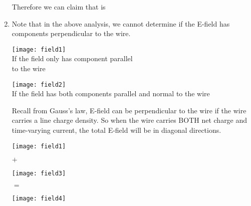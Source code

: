 \documentclass[class=article, crop=false, 12pt]{standalone}
\begin{document}
\begin{example}
\begin{enumerate}
        Therefore we can claim that  is

        \newpage
        \item Note that in the above analysis,
        we cannot determine if the E-field has components perpendicular to the wire.

        \begin{center}
            \begin{minipage}{0.3\linewidth}
                \centering
                \texttt{[image: field1]}\\
                If the field only has component parallel\\ to the wire
            \end{minipage}
            \hspace{0.05\textwidth}
            \begin{minipage}{0.3\linewidth}
                \centering
                \texttt{[image: field2]}\\
                If the field has both components parallel and normal to the wire
            \end{minipage}
        \end{center}
        
        Recall from Gauss's law, 
        E-field can be perpendicular to the wire if the wire carries a  line charge density.
        So when the wire carries BOTH net charge and time-varying current,
        the total E-field will be in diagonal directions.

        \begin{center}
            \begin{minipage}{0.2\linewidth}
                \centering
                \texttt{[image: field1]}
            \end{minipage}
            {\huge \quad$+$\quad}
            \begin{minipage}{0.2\linewidth}
                \centering
                \texttt{[image: field3]}
            \end{minipage}
            {\huge \quad$=$\quad}
            \begin{minipage}{0.2\linewidth}
                \centering
                \texttt{[image: field4]}
            \end{minipage}
        \end{center}

    \end{enumerate}

    
\end{example}
\end{document}
